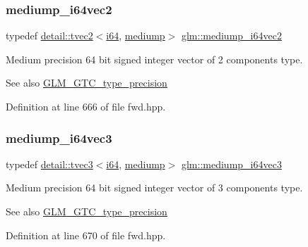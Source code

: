 \subsubsection{\texorpdfstring{mediump\+\_\+i64vec2}{mediump\_i64vec2}}
{\footnotesize\ttfamily typedef \hyperlink{structglm_1_1detail_1_1tvec2}{detail\+::tvec2}$<$\hyperlink{group__gtc__type__precision_gac7a7eaad46064fc952b06df33689da23}{i64}, \hyperlink{namespaceglm_a0f04f086094c747d227af4425893f545a6416f3ea0c9025fb21ed50c4d6620482}{mediump}$>$ \hyperlink{group__gtc__type__precision_ga5cf0bec13b01b6124e966360cffe15a4}{glm\+::mediump\+\_\+i64vec2}}

Medium precision 64 bit signed integer vector of 2 components type. \begin{DoxySeeAlso}{See also}
\hyperlink{group__gtc__type__precision}{G\+L\+M\+\_\+\+G\+T\+C\+\_\+type\+\_\+precision} 
\end{DoxySeeAlso}


Definition at line 666 of file fwd.\+hpp.

\mbox{\label{group__gtc__type__precision_gae1aa82d2b9a62a87648306205dfe69ab}} 
\subsubsection{\texorpdfstring{mediump\+\_\+i64vec3}{mediump\_i64vec3}}
{\footnotesize\ttfamily typedef \hyperlink{structglm_1_1detail_1_1tvec3}{detail\+::tvec3}$<$\hyperlink{group__gtc__type__precision_gac7a7eaad46064fc952b06df33689da23}{i64}, \hyperlink{namespaceglm_a0f04f086094c747d227af4425893f545a6416f3ea0c9025fb21ed50c4d6620482}{mediump}$>$ \hyperlink{group__gtc__type__precision_gae1aa82d2b9a62a87648306205dfe69ab}{glm\+::mediump\+\_\+i64vec3}}

Medium precision 64 bit signed integer vector of 3 components type. \begin{DoxySeeAlso}{See also}
\hyperlink{group__gtc__type__precision}{G\+L\+M\+\_\+\+G\+T\+C\+\_\+type\+\_\+precision} 
\end{DoxySeeAlso}


Definition at line 670 of file fwd.\+hpp.

\mbox{\label{group__gtc__type__precision_gab4db11ebb425fa18fe5d15d455c360a3}} 
